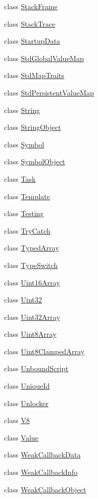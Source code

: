 \begin{DoxyCompactItemize}
\item 
class \hyperlink{classv8_1_1_stack_frame}{Stack\+Frame}
\item 
class \hyperlink{classv8_1_1_stack_trace}{Stack\+Trace}
\item 
class \hyperlink{classv8_1_1_startup_data}{Startup\+Data}
\item 
class \hyperlink{classv8_1_1_std_global_value_map}{Std\+Global\+Value\+Map}
\item 
class \hyperlink{classv8_1_1_std_map_traits}{Std\+Map\+Traits}
\item 
class \hyperlink{classv8_1_1_std_persistent_value_map}{Std\+Persistent\+Value\+Map}
\item 
class \hyperlink{classv8_1_1_string}{String}
\item 
class \hyperlink{classv8_1_1_string_object}{String\+Object}
\item 
class \hyperlink{classv8_1_1_symbol}{Symbol}
\item 
class \hyperlink{classv8_1_1_symbol_object}{Symbol\+Object}
\item 
class \hyperlink{classv8_1_1_task}{Task}
\item 
class \hyperlink{classv8_1_1_template}{Template}
\item 
class \hyperlink{classv8_1_1_testing}{Testing}
\item 
class \hyperlink{classv8_1_1_try_catch}{Try\+Catch}
\item 
class \hyperlink{classv8_1_1_typed_array}{Typed\+Array}
\item 
class \hyperlink{classv8_1_1_type_switch}{Type\+Switch}
\item 
class \hyperlink{classv8_1_1_uint16_array}{Uint16\+Array}
\item 
class \hyperlink{classv8_1_1_uint32}{Uint32}
\item 
class \hyperlink{classv8_1_1_uint32_array}{Uint32\+Array}
\item 
class \hyperlink{classv8_1_1_uint8_array}{Uint8\+Array}
\item 
class \hyperlink{classv8_1_1_uint8_clamped_array}{Uint8\+Clamped\+Array}
\item 
class \hyperlink{classv8_1_1_unbound_script}{Unbound\+Script}
\item 
class \hyperlink{classv8_1_1_unique_id}{Unique\+Id}
\item 
class \hyperlink{classv8_1_1_unlocker}{Unlocker}
\item 
class \hyperlink{classv8_1_1_v8}{V8}
\item 
class \hyperlink{classv8_1_1_value}{Value}
\item 
class \hyperlink{classv8_1_1_weak_callback_data}{Weak\+Callback\+Data}
\item 
class \hyperlink{classv8_1_1_weak_callback_info}{Weak\+Callback\+Info}
\item 
class \hyperlink{classv8_1_1_weak_callback_object}{Weak\+Callback\+Object}
\end{DoxyCompactItemize}
